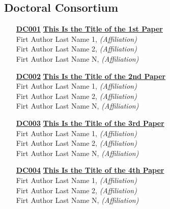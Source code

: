 \subsection{Doctoral Consortium}
\begin{enumerate}
\item[\href{https://doi.org/10.1145/1122445.1122456}{\textbf{DC001}}]
\href{https://doi.org/10.1145/1122445.1122456}{\textbf{This Is the Title of the 1st Paper}}\\
Firt Author Last Name 1, \emph{(Affiliation)}\\
Firt Author Last Name 2, \emph{(Affiliation)}\\
Firt Author Last Name N, \emph{(Affiliation)}\\

\item[\href{https://doi.org/10.1145/1122445.1122456}{\textbf{DC002}}]
\href{https://doi.org/10.1145/1122445.1122456}{\textbf{This Is the Title of the 2nd Paper}}\\
Firt Author Last Name 1, \emph{(Affiliation)}\\
Firt Author Last Name 2, \emph{(Affiliation)}\\
Firt Author Last Name N, \emph{(Affiliation)}\\

\item[\href{https://doi.org/10.1145/1122445.1122456}{\textbf{DC003}}]
\href{https://doi.org/10.1145/1122445.1122456}{\textbf{This Is the Title of the 3rd Paper}}\\
Firt Author Last Name 1, \emph{(Affiliation)}\\
Firt Author Last Name 2, \emph{(Affiliation)}\\
Firt Author Last Name N, \emph{(Affiliation)}\\

\item[\href{https://doi.org/10.1145/1122445.1122456}{\textbf{DC004}}]
\href{https://doi.org/10.1145/1122445.1122456}{\textbf{This Is the Title of the 4th Paper}}\\
Firt Author Last Name 1, \emph{(Affiliation)}\\
Firt Author Last Name 2, \emph{(Affiliation)}\\
Firt Author Last Name N, \emph{(Affiliation)}\\
\end{enumerate}


